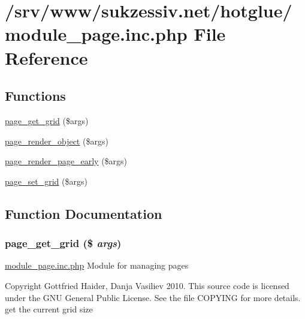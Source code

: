 \hypertarget{module__page_8inc_8php}{
\section{/srv/www/sukzessiv.net/hotglue/module\_\-page.inc.php File Reference}
\label{module__page_8inc_8php}
}
\subsection*{Functions}
\begin{CompactItemize}
\item 
\hyperlink{module__page_8inc_8php_ac90d98ff7e17055e3dc3d953371d673}{page\_\-get\_\-grid} (\$args)
\item 
\hyperlink{module__page_8inc_8php_53e7091b9a654d0d772cea6e3127820e}{page\_\-render\_\-object} (\$args)
\item 
\hyperlink{module__page_8inc_8php_80aff2ea069c7a2ba120e26bb218efa5}{page\_\-render\_\-page\_\-early} (\$args)
\item 
\hyperlink{module__page_8inc_8php_aadab51471c838ab9a0fa0c93a04b817}{page\_\-set\_\-grid} (\$args)
\end{CompactItemize}


\subsection{Function Documentation}
\hypertarget{module__page_8inc_8php_ac90d98ff7e17055e3dc3d953371d673}{
\subsubsection[{page\_\-get\_\-grid}]{\setlength{\rightskip}{0pt plus 5cm}page\_\-get\_\-grid (\$ {\em args})}}
\label{module__page_8inc_8php_ac90d98ff7e17055e3dc3d953371d673}


\hyperlink{module__page_8inc_8php}{module\_\-page.inc.php} Module for managing pages

Copyright Gottfried Haider, Danja Vasiliev 2010. This source code is licensed under the GNU General Public License. See the file COPYING for more details. get the current grid size

